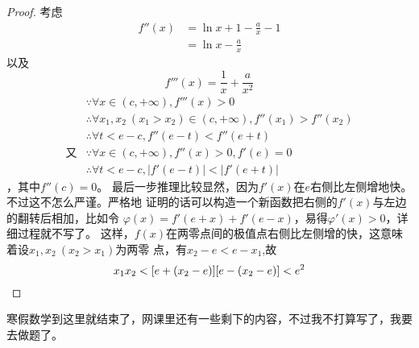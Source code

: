 \begin{proof}
考虑
\begin{align}
f''(x)
&= \ln{x} + 1 - \frac{a}{x} - 1 \nonumber \\
&= \ln{x} - \frac{a}{x} 
\end{align}
以及
\begin{equation}
f'''(x) = \frac{1}{x} + \frac{a}{x^2}
\end{equation}
\begin{align*}
&\because \forall x \in (c, +\infty), f'''(x) > 0\\
&\therefore \forall x_1, x_2\ (x_1>x_2) \in (c, +\infty), f''(x_1) > f''(x_2)\\
&\therefore \forall t < e - c, f''(e-t) < f''(e+t)\\
\text{又} &\because \forall x \in (c, +\infty), f''(x) > 0, f'(e) = 0\\
&\therefore \forall t < e - c, |f'(e-t)| < |f'(e+t)|
\end{align*}，其中\(f''(c)=0\)。
最后一步推理比较显然，因为\(f'(x)\)在\(e\)右侧比左侧增地快。不过这不怎么严谨。严格地
证明的话可以构造一个新函数把右侧的\(f'(x)\)与左边的翻转后相加，比如令
\(\varphi (x) = f'(e+x) + f'(e-x)\)，易得\(\varphi '(x) > 0\)，详细过程就不写了。
这样，\(f(x)\)在两零点间的极值点右侧比左侧增的快，这意味着设\(x_1, x_2\ (x_2 > x_1)\)为两零
点，有\(x_2 - e < e - x_1\),故
\begin{equation*}
x_1x_2 < [e + (x_2 - e)][e - (x_2 - e)]
< e^2 \qedhere
\end{equation*}
\end{proof}

寒假数学到这里就结束了，网课里还有一些剩下的内容，不过我不打算写了，我要去做题了。